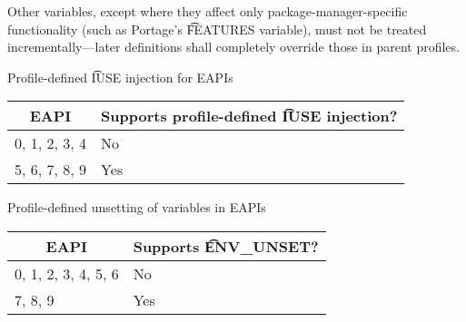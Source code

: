 Other variables, except where they affect only package-manager-specific functionality (such as
Portage's \t{FEATURES} variable), must not be treated incrementally---later definitions shall
completely override those in parent profiles.

\begin{centertable}{Profile-defined \t{IUSE} injection for EAPIs}
    \label{tab:profile-iuse-injection-table}
    \begin{tabular}{ll}
      \toprule
      \multicolumn{1}{c}{\textbf{EAPI}} &
      \multicolumn{1}{c}{\textbf{Supports profile-defined \t{IUSE} injection?}} \\
      \midrule
      0, 1, 2, 3, 4     & No  \\
      5, 6, 7, 8, 9     & Yes \\
      \bottomrule
    \end{tabular}
\end{centertable}

\begin{centertable}{Profile-defined unsetting of variables in EAPIs}
    \label{tab:profile-env-unset}
    \begin{tabular}{ll}
      \toprule
      \multicolumn{1}{c}{\textbf{EAPI}} &
      \multicolumn{1}{c}{\textbf{Supports \t{ENV_UNSET}?}} \\
      \midrule
      0, 1, 2, 3, 4, 5, 6 & No  \\
      7, 8, 9             & Yes \\
      \bottomrule
    \end{tabular}
\end{centertable}

